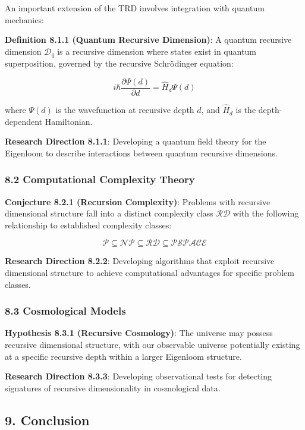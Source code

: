 \documentclass[
]{article}
\begin{document}
An important extension of the TRD involves integration with quantum
mechanics:

\textbf{Definition 8.1.1 (Quantum Recursive Dimension)}: A quantum
recursive dimension \(\mathcal{D}_q\) is a recursive dimension where
states exist in quantum superposition, governed by the recursive
Schrödinger equation:

\[i\hbar \frac{\partial \Psi(d)}{\partial d} = \hat{H}_d \Psi(d)\]

where \(\Psi(d)\) is the wavefunction at recursive depth \(d\), and
\(\hat{H}_d\) is the depth-dependent Hamiltonian.

\textbf{Research Direction 8.1.1}: Developing a quantum field theory for
the Eigenloom to describe interactions between quantum recursive
dimensions.

\subsubsection{8.2 Computational Complexity
Theory}\label{computational-complexity-theory-1}

\textbf{Conjecture 8.2.1 (Recursion Complexity)}: Problems with
recursive dimensional structure fall into a distinct complexity class
\(\mathcal{RD}\) with the following relationship to established
complexity classes:

\[\mathcal{P} \subseteq \mathcal{NP} \subseteq \mathcal{RD} \subseteq \mathcal{PSPACE}\]

\textbf{Research Direction 8.2.2}: Developing algorithms that exploit
recursive dimensional structure to achieve computational advantages for
specific problem classes.

\subsubsection{8.3 Cosmological Models}\label{cosmological-models}

\textbf{Hypothesis 8.3.1 (Recursive Cosmology)}: The universe may
possess recursive dimensional structure, with our observable universe
potentially existing at a specific recursive depth within a larger
Eigenloom structure.

\textbf{Research Direction 8.3.3}: Developing observational tests for
detecting signatures of recursive dimensionality in cosmological data.

\subsection{9. Conclusion}\label{conclusion-6}
\end{document}
